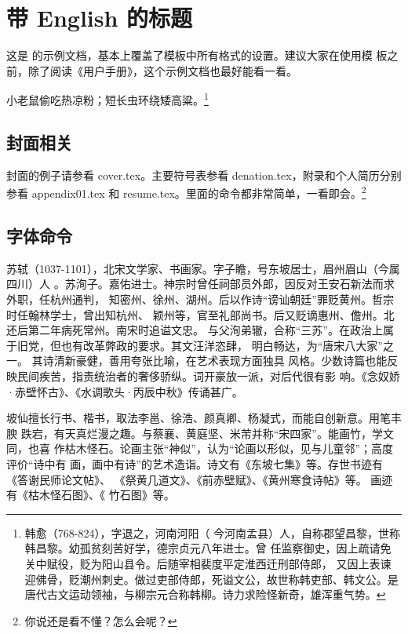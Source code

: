 

\chapter{带 English 的标题}
\label{cha:intro}

这是 \ucasthesis{} 的示例文档，基本上覆盖了模板中所有格式的设置。建议大家在使用模
板之前，除了阅读《\ucasthesis{}用户手册》，这个示例文档也最好能看一看。

小老鼠偷吃热凉粉；短长虫环绕矮高粱。\footnote{韩愈（768-824），字退之，河南河阳（
  今河南孟县）人，自称郡望昌黎，世称韩昌黎。幼孤贫刻苦好学，德宗贞元八年进士。曾
  任监察御史，因上疏请免关中赋役，贬为阳山县令。后随宰相裴度平定淮西迁刑部侍郎，
  又因上表谏迎佛骨，贬潮州刺史。做过吏部侍郎，死谥文公，故世称韩吏部、韩文公。是
  唐代古文运动领袖，与柳宗元合称韩柳。诗力求险怪新奇，雄浑重气势。}
  
\section{封面相关}
封面的例子请参看 cover.tex。主要符号表参看 denation.tex，附录和个人简历分别参看 appendix01.tex
和 resume.tex。里面的命令都非常简单，一看即会。\footnote{你说还是看不懂？怎么会呢？}

\section{字体命令}
\label{sec:first}

苏轼（1037-1101），北宋文学家、书画家。字子瞻，号东坡居士，眉州眉山（今属四川）人
。苏洵子。嘉佑进士。神宗时曾任祠部员外郎，因反对王安石新法而求外职，任杭州通判，
知密州、徐州、湖州。后以作诗“谤讪朝廷”罪贬黄州。哲宗时任翰林学士，曾出知杭州、
颖州等，官至礼部尚书。后又贬谪惠州、儋州。北还后第二年病死常州。南宋时追谥文忠。
与父洵弟辙，合称“三苏”。在政治上属于旧党，但也有改革弊政的要求。其文汪洋恣肆，
明白畅达，为“唐宋八大家”之一。  其诗清新豪健，善用夸张比喻，在艺术表现方面独具
风格。少数诗篇也能反映民间疾苦，指责统治者的奢侈骄纵。词开豪放一派，对后代很有影
响。《念奴娇·赤壁怀古》、《水调歌头·丙辰中秋》传诵甚广。

{\kaishu 坡仙擅长行书、楷书，取法李邕、徐浩、颜真卿、杨凝式，而能自创新意。用笔丰腴
  跌宕，有天真烂漫之趣。与蔡襄、黄庭坚、米芾并称“宋四家”。能画竹，学文同，也喜
  作枯木怪石。论画主张“神似”，认为“论画以形似，见与儿童邻”；高度评价“诗中有
  画，画中有诗”的艺术造诣。诗文有《东坡七集》等。存世书迹有《答谢民师论文帖》、
  《祭黄几道文》、《前赤壁赋》、《黄州寒食诗帖》等。  画迹有《枯木怪石图》、《
  竹石图》等。}

